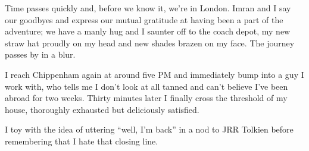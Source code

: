 \documentclass[a5paper,titlepage,11pt]{book}
\begin{document}
Time passes quickly and, before we know it, we're in London.  Imran and I say our goodbyes and express our mutual gratitude at having been a part of the adventure; we have a manly hug and I saunter off to the coach depot, my new straw hat proudly on my head and new shades brazen on my face.  The journey passes by in a blur.

I reach Chippenham again at around five PM and immediately bump into a guy I work with, who tells me I don't look at all tanned and can't believe I've been abroad for two weeks.  Thirty minutes later I finally cross the threshold of my house, thoroughly exhausted but deliciously satisfied.

I toy with the idea of uttering ``well, I'm back'' in a nod to JRR Tolkien before remembering that I hate that closing line.
\end{document}
